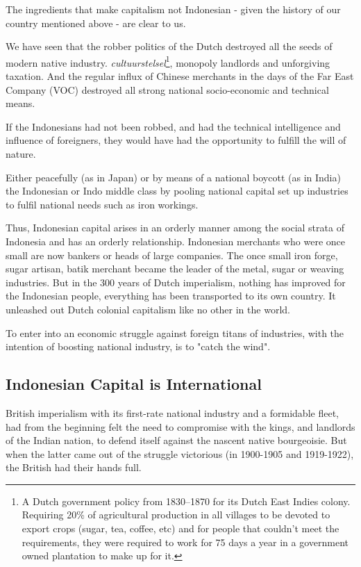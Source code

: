 The ingredients that make capitalism not Indonesian - given the history of our country mentioned above - are clear to us.\vskip 0.2in

We have seen that the robber politics of the Dutch destroyed all the seeds of modern native industry. 
\emph{cultuurstelsel}\footnote[4]{A Dutch government policy from 1830–1870 for its Dutch East Indies colony. Requiring 20\% of agricultural production in all villages to be devoted to export crops (sugar, tea, coffee, etc) and for people that couldn't meet the requirements, they were required to work for 75 days a year in a government owned plantation to make up for it.}, 
monopoly landlords and unforgiving taxation. And the regular influx of Chinese merchants in 
the days of the Far East Company (VOC) destroyed all strong national socio-economic and technical means.\vskip 0.2in

If the Indonesians had not been robbed, and had the technical intelligence 
and influence of foreigners, they would have had the opportunity to fulfill the will of nature.\vskip 0.2in

Either peacefully (as in Japan) or by means of a national boycott (as in India) 
the Indonesian or Indo middle class by pooling national capital set up industries to fulfil national needs such as iron workings.\vskip 0.2in

Thus, Indonesian capital arises in an orderly manner among the social strata 
of Indonesia and has an orderly relationship. Indonesian merchants who were once 
small are now bankers or heads of large companies. The once small iron forge, sugar 
artisan, batik merchant became the leader of the metal, sugar or weaving industries. 
But in the 300 years of Dutch imperialism, nothing has improved for the Indonesian 
people, everything has been transported to its own country. It unleashed out Dutch colonial capitalism like no other in the world.\vskip 0.2in

To enter into an economic struggle against foreign titans of industries, 
with the intention of boosting national industry, is to "catch the wind".\vskip 0.2in

\subsection{Indonesian Capital is International}

British imperialism with its first-rate national industry and a formidable fleet, had from 
the beginning felt the need to compromise with the kings, and landlords of the Indian nation, 
to defend itself against the nascent native bourgeoisie. But when the latter came out of the 
struggle victorious (in 1900-1905 and 1919-1922), the British had their hands full.\vskip 0.2in

